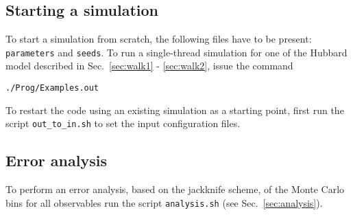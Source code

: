\subsection{Starting a simulation}

To start a simulation from scratch, the following files have to be present: \texttt{parameters} and \texttt{seeds}. 
To run a single-thread simulation for one of the  Hubbard model described in Sec.~\ref{sec:walk1} - \ref{sec:walk2}, issue the command
\begin{verbatim}
./Prog/Examples.out
\end{verbatim}
To restart the code using an existing simulation as a starting point, first run the script \texttt{out\_to\_in.sh} to set 
the input configuration files.

\subsection{Error analysis}

To perform an error analysis, based on the jackknife scheme, of the Monte Carlo bins for all observables run the script \texttt{analysis.sh} 
(see Sec.~\ref{sec:analysis}).

 



